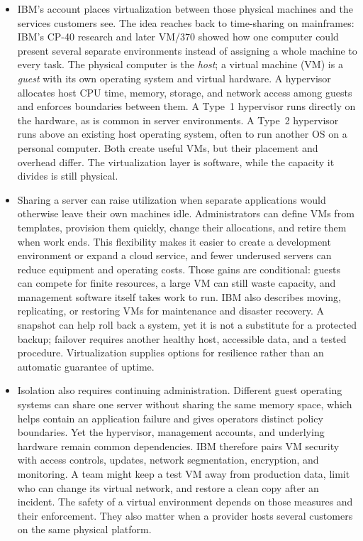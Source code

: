 \documentclass[10pt]{article}
\begin{document}
\begin{itemize}[leftmargin=1.25em, itemsep=0.3em, parsep=0pt, topsep=0pt]
    \item IBM's account places virtualization between those physical machines and the services customers see. The idea reaches back to time-sharing on mainframes: IBM's CP-40 research and later VM/370 showed how one computer could present several separate environments instead of assigning a whole machine to every task. The physical computer is the \textit{host}; a virtual machine (VM) is a \textit{guest} with its own operating system and virtual hardware. A hypervisor allocates host CPU time, memory, storage, and network access among guests and enforces boundaries between them. A Type~1 hypervisor runs directly on the hardware, as is common in server environments. A Type~2 hypervisor runs above an existing host operating system, often to run another OS on a personal computer. Both create useful VMs, but their placement and overhead differ. The virtualization layer is software, while the capacity it divides is still physical.

    \item Sharing a server can raise utilization when separate applications would otherwise leave their own machines idle. Administrators can define VMs from templates, provision them quickly, change their allocations, and retire them when work ends. This flexibility makes it easier to create a development environment or expand a cloud service, and fewer underused servers can reduce equipment and operating costs. Those gains are conditional: guests can compete for finite resources, a large VM can still waste capacity, and management software itself takes work to run. IBM also describes moving, replicating, or restoring VMs for maintenance and disaster recovery. A snapshot can help roll back a system, yet it is not a substitute for a protected backup; failover requires another healthy host, accessible data, and a tested procedure. Virtualization supplies options for resilience rather than an automatic guarantee of uptime.

    \item Isolation also requires continuing administration. Different guest operating systems can share one server without sharing the same memory space, which helps contain an application failure and gives operators distinct policy boundaries. Yet the hypervisor, management accounts, and underlying hardware remain common dependencies. IBM therefore pairs VM security with access controls, updates, network segmentation, encryption, and monitoring. A team might keep a test VM away from production data, limit who can change its virtual network, and restore a clean copy after an incident. The safety of a virtual environment depends on those measures and their enforcement. They also matter when a provider hosts several customers on the same physical platform.


\end{itemize}
\end{document}
